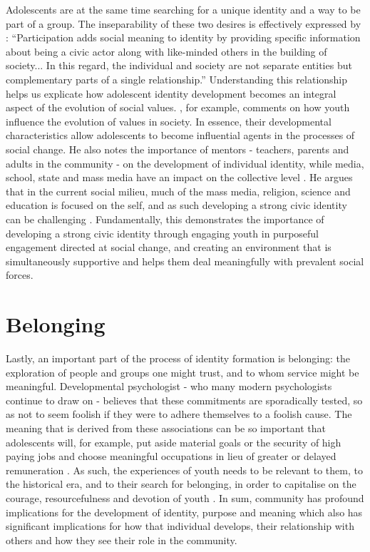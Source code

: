 Adolescents are at the same time searching for a unique identity and a way to be part of a group. The inseparability of these two desires is effectively expressed by \citet[][p626]{Youniss1997}: “Participation adds social meaning to identity by providing specific information about being a civic actor along with like-minded others in the building of society... In this regard, the individual and society are not separate entities but complementary parts of a single relationship.” Understanding this relationship helps us explicate how adolescent identity development becomes an integral aspect of the evolution of social values. \citet{Juhasz1982}, for example, comments on how youth influence the evolution of values in society. In essence, their developmental characteristics allow adolescents to become influential agents in the processes of social change. He also notes the importance of mentors - teachers, parents and adults in the community - on the development of individual identity, while media, school, state and mass media have an impact on the collective level \citep{Juhasz1982}. He argues that in the current social milieu, much of the mass media, religion, science and education is focused on the self, and as such developing a strong civic identity can be challenging \citep{Juhasz1982}. Fundamentally, this demonstrates the importance of developing a strong civic identity through engaging youth in purposeful engagement directed at social change, and creating an environment that is simultaneously supportive and helps them deal meaningfully with prevalent social forces. 

\section{Belonging}
\label{BelongingPsych}
Lastly, an important part of the process of identity formation is belonging: the exploration of people and groups one might trust, and to whom service might be meaningful. Developmental psychologist \citet{Erikson1968} - who many modern psychologists continue to draw on - believes that these commitments are sporadically tested, so as not to seem foolish if they were to adhere themselves to a foolish cause. The meaning that is derived from these associations can be so important that adolescents will, for example, put aside material goals or the security of high paying jobs and choose meaningful occupations in lieu of greater or delayed remuneration \citep{Erikson1968}. As such, the experiences of youth needs to be relevant to them, to the historical era, and to their search for belonging, in order to capitalise on the courage, resourcefulness and devotion of youth \citep{Verlande2002}. In sum, community has profound implications for the development of identity, purpose and meaning which also has significant implications for how that individual develops, their relationship with others and how they see their role in the community. 


